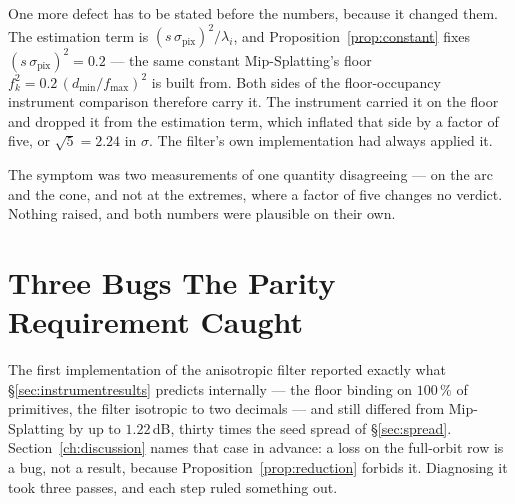 One more defect has to be stated before the numbers, because it changed them.
The estimation term is $(s\,\sigma_{\mathrm{pix}})^2/\lambda_i$, and
Proposition~\ref{prop:constant} fixes $(s\,\sigma_{\mathrm{pix}})^2 = 0.2$ ---
the same constant Mip-Splatting's floor $f_k^2 = 0.2\,(d_{\min}/f_{\max})^2$ is
built from. Both sides of the floor-occupancy instrument comparison therefore carry it. The instrument
carried it on the floor and dropped it from the estimation term, which inflated
that side by a factor of five, or $\sqrt{5} = 2.24$ in $\sigma$. The filter's own
implementation had always applied it.

The symptom was two measurements of one quantity disagreeing --- on the arc and
the cone, and not at the extremes, where a factor of five changes no verdict.
Nothing raised, and both numbers were plausible on their own.



\section{Three Bugs The Parity Requirement Caught}
\label{sec:b1bugs}

The first implementation of the anisotropic filter reported exactly what
\S\ref{sec:instrumentresults} predicts internally --- the floor binding on
$100\,\%$ of primitives, the filter isotropic to two decimals --- and still
differed from Mip-Splatting by up to $1.22$\,dB, thirty times the seed spread of
\S\ref{sec:spread}. Section~\ref{ch:discussion} names that case in advance: a
loss on the full-orbit row is a bug, not a result, because
Proposition~\ref{prop:reduction} forbids it. Diagnosing it took three passes, and each step ruled something out.

